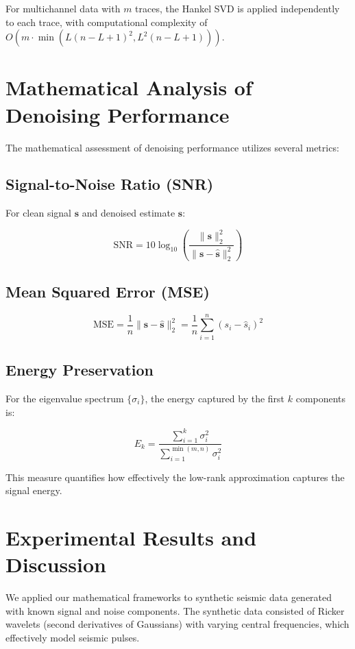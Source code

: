\documentclass[10pt,twocolumn]{article}
\begin{document}
For multichannel data with $m$ traces, the Hankel SVD is applied independently to each trace, with computational complexity of $O(m \cdot \min(L(n-L+1)^2, L^2(n-L+1)))$.

\section{Mathematical Analysis of Denoising Performance}
The mathematical assessment of denoising performance utilizes several metrics:

\subsection{Signal-to-Noise Ratio (SNR)}
For clean signal $\mathbf{s}$ and denoised estimate $\mathbf{\hat{s}}$:

\begin{equation}
\text{SNR} = 10 \log_{10} \left( \frac{\|\mathbf{s}\|_2^2}{\|\mathbf{s} - \mathbf{\hat{s}}\|_2^2} \right)
\end{equation}

\subsection{Mean Squared Error (MSE)}
\begin{equation}
\text{MSE} = \frac{1}{n} \|\mathbf{s} - \mathbf{\hat{s}}\|_2^2 = \frac{1}{n} \sum_{i=1}^{n} (s_i - \hat{s}_i)^2
\end{equation}

\subsection{Energy Preservation}
For the eigenvalue spectrum $\{\sigma_i\}$, the energy captured by the first $k$ components is:

\begin{equation}
E_k = \frac{\sum_{i=1}^{k} \sigma_i^2}{\sum_{i=1}^{\min(m,n)} \sigma_i^2}
\end{equation}

This measure quantifies how effectively the low-rank approximation captures the signal energy.

\section{Experimental Results and Discussion}
We applied our mathematical frameworks to synthetic seismic data generated with known signal and noise components. The synthetic data consisted of Ricker wavelets (second derivatives of Gaussians) with varying central frequencies, which effectively model seismic pulses.
\end{document}
